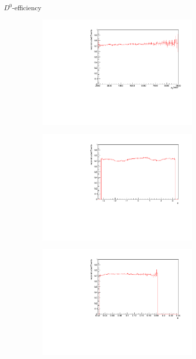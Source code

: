 \documentclass[11pt]{beamer}
\begin{document}
\begin{frame}{$D^0$-efficiency}
\begin{figure}
\begin{subfigure}{0.45\textwidth}
\includegraphics[width=0.9\textwidth]{up_pdf/single/pos/h_pt_reco_D0_pos.pdf}
\end{subfigure}
\begin{subfigure}{0.45\textwidth}
\includegraphics[width=0.9\textwidth]{up_pdf/single/pos/h_phi_reco_D0_pos.pdf}
\end{subfigure}
\begin{subfigure}{0.45\textwidth}
\includegraphics[width=0.9\textwidth]{up_pdf/single/pos/h_theta_reco_D0_pos.pdf}

\end{subfigure}
\end{figure}
\end{frame}
\end{document}
